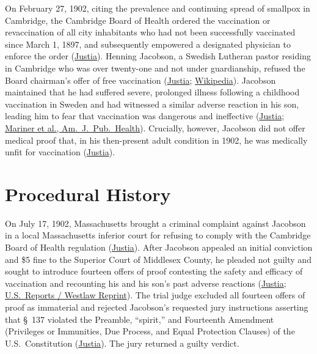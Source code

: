 \documentclass[12pt]{article}
\begin{document}
On February 27, 1902, citing the prevalence and continuing spread of smallpox in Cambridge, the Cambridge Board of Health ordered the vaccination or revaccination of all city inhabitants who had not been successfully vaccinated since March 1, 1897, and subsequently empowered a designated physician to enforce the order (\href{https://supreme.justia.com/cases/federal/us/197/11/}{Justia}). Henning Jacobson, a Swedish Lutheran pastor residing in Cambridge who was over twenty-one and not under guardianship, refused the Board chairman's offer of free vaccination (\href{https://supreme.justia.com/cases/federal/us/197/11/}{Justia}; \href{https://en.wikipedia.org/wiki/Jacobson_v._Massachusetts}{Wikipedia}). Jacobson maintained that he had suffered severe, prolonged illness following a childhood vaccination in Sweden and had witnessed a similar adverse reaction in his son, leading him to fear that vaccination was dangerous and ineffective (\href{https://supreme.justia.com/cases/federal/us/197/11/}{Justia}; \href{https://pmc.ncbi.nlm.nih.gov/articles/PMC1449224/}{Mariner et al., Am.\ J.\ Pub.\ Health}). Crucially, however, Jacobson did not offer medical proof that, in his then-present adult condition in 1902, he was medically unfit for vaccination (\href{https://supreme.justia.com/cases/federal/us/197/11/}{Justia}).

\section{Procedural History}

On July 17, 1902, Massachusetts brought a criminal complaint against Jacobson in a local Massachusetts inferior court for refusing to comply with the Cambridge Board of Health regulation (\href{https://supreme.justia.com/cases/federal/us/197/11/}{Justia}). After Jacobson appealed an initial conviction and \$5 fine to the Superior Court of Middlesex County, he pleaded not guilty and sought to introduce fourteen offers of proof contesting the safety and efficacy of vaccination and recounting his and his son's past adverse reactions (\href{https://supreme.justia.com/cases/federal/us/197/11/}{Justia}; \href{https://purposedrivenlawyers.com/wp-content/uploads/2024/06/Jacobson-v-Commonwealth-of-Massachusetts.pdf}{U.S.\ Reports / Westlaw Reprint}). The trial judge excluded all fourteen offers of proof as immaterial and rejected Jacobson's requested jury instructions asserting that \S~137 violated the Preamble, ``spirit,'' and Fourteenth Amendment (Privileges or Immunities, Due Process, and Equal Protection Clauses) of the U.S.\ Constitution (\href{https://supreme.justia.com/cases/federal/us/197/11/}{Justia}). The jury returned a guilty verdict.
\end{document}
